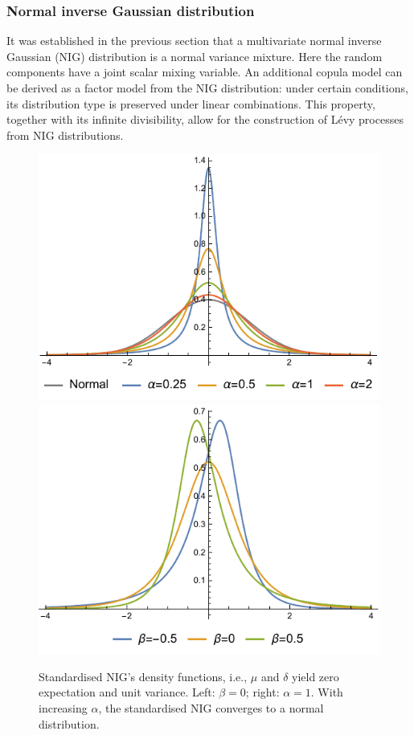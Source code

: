\subsubsection{Normal inverse Gaussian distribution}
\label{sec:norm-inverse-gauss-2}

It was established in the previous section that a multivariate normal
inverse Gaussian (NIG)
distribution is a normal variance mixture. Here the random components 
have a joint scalar mixing variable. 
An additional copula model can be derived as a factor model from the
NIG distribution: under certain conditions, its distribution type is
preserved under linear combinations. This property, together with 
its infinite divisibility, allow for the construction of L\'evy
processes from NIG distributions.

\begin{figure}[t]
  \centering
  \includegraphics[scale=.85]{_pics/nigpdf1.pdf}
  \includegraphics[scale=.85]{_pics/nigpdf2.pdf}
  \caption{Standardised NIG's density functions, i.e., $\mu$ and
    $\delta$ yield zero expectation and unit variance. Left:
    $\beta=0$; right: $\alpha=1$. With increasing $\alpha$, the
    standardised NIG converges to a normal distribution.} 
  \label{fig:nigpdf}
\end{figure}

